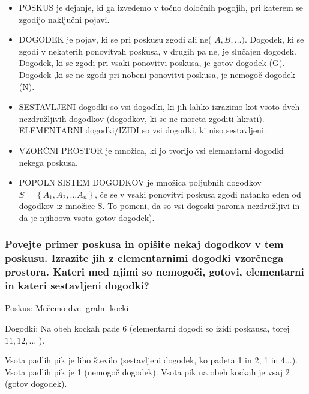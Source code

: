 \documentclass{article}
\begin{document}
\begin{itemize}
  \item POSKUS je dejanje, ki ga izvedemo v točno določnih pogojih, pri katerem se zgodijo naključni pojavi.


\item DOGODEK je pojav, ki se pri poskusu zgodi ali ne( $A, B, \ldots)$. Dogodek, ki se zgodi v nekaterih ponovitvah poskusa, v drugih pa ne, je slučajen dogodek. Dogodek, ki se zgodi pri vsaki ponovitvi poskusa, je gotov dogodek (G). Dogodek ,ki se ne zgodi pri nobeni ponovitvi poskusa, je nemogoč dogodek (N).

\item SESTAVLJENI dogodki so vsi dogodki, ki jih lahko izrazimo kot vsoto dveh nezdružljivih dogodkov (dogodkov, ki se ne moreta zgoditi hkrati). ELEMENTARNI dogodki/IZIDI so vsi dogodki, ki niso sestavljeni.


  \item VZORČNI PROSTOR je množica, ki jo tvorijo vsi elemantarni dogodki nekega poskusa.

  \item POPOLN SISTEM DOGODKOV je množica poljubnih dogodkov $S=\left\{A_{1}, A_{2}, \ldots A_{n}\right\}$, če se v vsaki ponovitvi poskusa zgodi natanko eden od dogodkov iz množice S. To pomeni, da so vsi dogoski paroma nezdružljivi in da je njihoova vsota gotov dogodek).

\end{itemize}

\subsubsection*{Povejte primer poskusa in opišite nekaj dogodkov v tem poskusu. Izrazite jih z elementarnimi dogodki vzorčnega prostora. Kateri med njimi so nemogoči, gotovi, elementarni in kateri sestavljeni dogodki?}

Poskus: Mečemo dve igralni kocki.

Dogodki: Na obeh kockah pade 6 (elementarni dogodi so izidi poskausa, torej $11,12, \ldots$ ).

Vsota padlih pik je liho število (sestavljeni dogodek, ko padeta 1 in 2, 1 in 4...). Vsota padlih pik je 1 (nemogoč dogodek). Vsota pik na obeh kockah je vsaj 2 (gotov dogodek).
\end{document}

